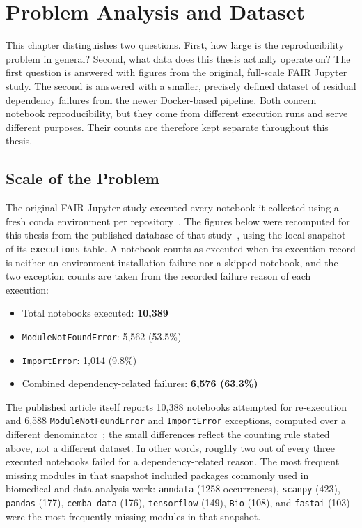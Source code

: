 \chapter{Problem Analysis and Dataset}
\label{chap:problem-dataset}

This chapter distinguishes two questions. First, how large is the
reproducibility problem in general? Second, what data does this thesis
actually operate on? The first question is answered with figures from the
original, full-scale FAIR Jupyter study. The second is answered with a smaller,
precisely defined dataset of residual dependency failures from the newer
Docker-based pipeline. Both concern notebook reproducibility, but they come
from different execution runs and serve different purposes. Their counts are
therefore kept separate throughout this thesis.

\section{Scale of the Problem}
\label{sec:pd-l1}

The original FAIR Jupyter study executed every notebook it collected using a
fresh conda environment per repository~\cite{samuel2024gigascience}. The
figures below were recomputed for this thesis from the published database
of that study~\cite{samuel2024zenodo}, using the local snapshot of its
\texttt{executions} table. A notebook counts as executed when its
execution record is neither an environment-installation failure nor a
skipped notebook, and the two exception counts are taken from the recorded
failure reason of each execution:

\begin{itemize}
  \item Total notebooks executed: \textbf{10,389}
  \item \texttt{ModuleNotFoundError}: 5,562 (53.5\%)
  \item \texttt{ImportError}: 1,014 (9.8\%)
  \item Combined dependency-related failures: \textbf{6,576 (63.3\%)}
\end{itemize}

The published article itself reports 10,388 notebooks attempted for
re-execution and 6,588 \texttt{ModuleNotFoundError} and
\texttt{ImportError} exceptions, computed over a different
denominator~\cite{samuel2024gigascience}; the small differences reflect
the counting rule stated above, not a different dataset. In other words,
roughly two out of every three executed notebooks failed for a
dependency-related reason. The most frequent missing modules in that snapshot
included packages commonly used in biomedical and data-analysis work:
\texttt{anndata} (1258 occurrences),
\texttt{scanpy} (423), \texttt{pandas} (177), \texttt{cemba\_data} (176),
\texttt{tensorflow} (149), \texttt{Bio} (108), and \texttt{fastai} (103) were
the most frequently missing modules in that snapshot.

